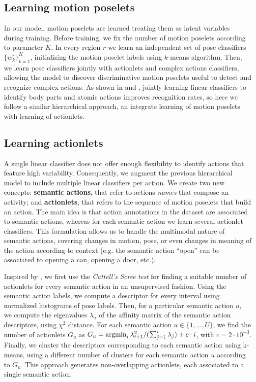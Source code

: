 \subsection{Learning motion poselets}
In our model, motion poselets are learned treating them as latent variables  
during training. Before training, we fix the number of motion poselets 
according to parameter $K$. In every region $r$ we learn an independent 
set of pose classifiers $\{w^r_k\}_{k=1}^K$, initializing the motion poselet 
labels using $k$-means algorithm. Then, we learn pose classifiers jointly with 
actionlets and complex actions classifiers, allowing the model to discover 
discriminative motion poselets useful to detect and recognize complex actions. 
As shown in \cite{Lillo2014} and \cite{Tao2015}, jointly learning linear 
classifiers to identify body parts and atomic actions improves recognition 
rates, so here we follow a similar hierarchical approach, an integrate learning 
of motion poselets with learning of actionlets.     

\subsection{Learning actionlets}
A single linear classifier does not offer enough flexibility to identify actions 
that feature high variability. Consequently, we augment the previous 
hierarchical model to include multiple linear classifiers per action. We create 
two new concepts: \textbf{semantic actions}, that refer to actions \emph{names} 
that compose an activity; and \textbf{actionlets}, that refers to the sequence 
of motion poselets that build an action. The main idea is that action 
annotations in the dataset are associated to semantic actions, whereas for each 
semantic action we learn several actionlet classifiers. This formulation allows 
us to handle the multimodal nature of semantic actions, covering changes in 
motion, pose, or even changes in meaning of the action according to context 
(e.g. the semantic action ``open'' can be associated to opening a can, opening a 
door, etc.). 

Inspired by \cite{Raptis2012}, we first use the \emph{Cattell's Scree test} for 
finding a suitable number of actionlets for every semantic action in an unsupervised fashion. Using 
the semantic action labels, we compute a descriptor for every interval using 
normalized histograms of pose labels. Then, for a particular semantic action 
$u$, we compute the eigenvalues $\lambda_u$ of the affinity matrix of the 
semantic action descriptors, using $\chi^2$ distance. For each semantic action 
$u \in \{1,\dots,U\}$, we find the number of actionlets $G_u$ as $G_u = 
\operatorname*{argmin}_i \lambda_{i+1}^2 / (\sum_{j=1}^i \lambda_j) + c\cdot i$, with $c=2\cdot 
10^{-3}$. Finally, we cluster the descriptors corresponding to each semantic 
action using k-means, using a different number of clusters for each semantic 
action $u$ according to $G_u$. This approach generates non-overlapping actionlets, each associated to a single semantic action.

